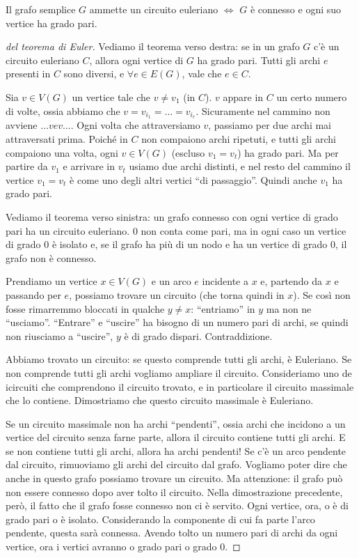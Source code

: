 \begin{theorem}
	Il grafo semplice $G$ ammette un circuito euleriano $\iff$ $G$ \`e connesso e ogni suo vertice ha grado pari.
\end{theorem}

\begin{proof}[del teorema di Euler]
	Vediamo il teorema verso destra: se in un grafo $G$ c'\`e un circuito euleriano $C$, allora ogni vertice di $G$ ha grado pari.
	Tutti gli archi $e$ presenti in $C$ sono diversi, e $\forall e \in E(G)$, vale che $e \in C$.

	Sia $v \in V(G)$ un vertice tale che $v \neq v_1$ (in $C$).
	$v$ appare in $C$ un certo numero di volte, ossia abbiamo che $v = v_{i_1} = \dots = v_{i_r}$.
	Sicuramente nel cammino non avviene $\dots v e v \dots$.
	Ogni volta che attraversiamo $v$, passiamo per due archi mai attraversati prima.
	Poich\'e in $C$ non compaiono archi ripetuti, e tutti gli archi compaiono una volta, ogni $v \in V(G)$ (escluso $v_1 = v_t$) ha grado pari.
	Ma per partire da $v_1$ e arrivare in $v_t$ usiamo due archi distinti, e nel resto del cammino il vertice $v_1 = v_t$ \`e come uno degli altri vertici ``di passaggio''.
	Quindi anche $v_1$ ha grado pari.

	Vediamo il teorema verso sinistra: un grafo connesso con ogni vertice di grado pari ha un circuito euleriano.
	0 non conta come pari, ma in ogni caso un vertice di grado 0 \`e isolato e, se il grafo ha pi\`u di un nodo e ha un vertice di grado 0, il grafo non \`e connesso.

	Prendiamo un vertice $x \in V(G)$ e un arco $e$ incidente a $x$ e, partendo da $x$ e passando per $e$, possiamo trovare un circuito (che torna quindi in $x$).
	Se cos\`i non fosse rimarremmo bloccati in qualche $y \neq x$: ``entriamo'' in $y$ ma non ne ``usciamo''.
	``Entrare'' e ``uscire'' ha bisogno di un numero pari di archi, se quindi non riusciamo a ``uscire'', $y$ \`e di grado dispari.
	Contraddizione.

	Abbiamo trovato un circuito: se questo comprende tutti gli archi, \`e Euleriano.
	Se non comprende tutti gli archi vogliamo ampliare il circuito.
	Consideriamo uno de icircuiti che comprendono il circuito trovato, e in particolare il circuito massimale che lo contiene.
	Dimostriamo che questo circuito massimale \`e Euleriano.

	Se un circuito massimale non ha archi ``pendenti'', ossia archi che incidono a un vertice del circuito senza farne parte, allora il circuito contiene tutti gli archi.
	E se non contiene tutti gli archi, allora ha archi pendenti!
	Se c'\`e un arco pendente dal circuito, rimuoviamo gli archi del circuito dal grafo.
	Vogliamo poter dire che anche in questo grafo possiamo trovare un circuito.
	Ma attenzione: il grafo pu\`o non essere connesso dopo aver tolto il circuito.
	Nella dimostrazione precedente, per\`o, il fatto che il grafo fosse connesso non ci \`e servito.
	Ogni vertice, ora, o \`e di grado pari o \`e isolato.
	Considerando la componente di cui fa parte l'arco pendente, questa sar\`a connessa.
	Avendo tolto un numero pari di archi da ogni vertice, ora i vertici avranno o grado pari o grado 0.


\end{proof}
